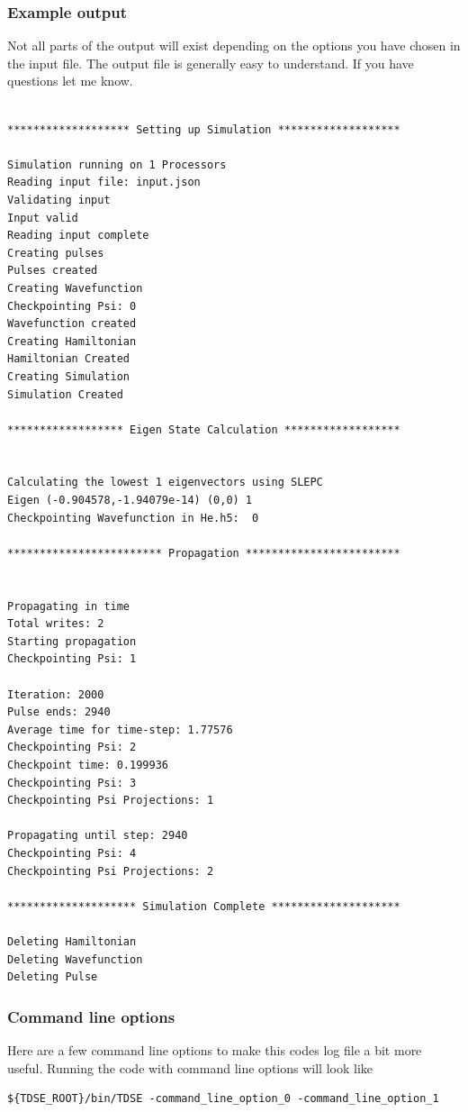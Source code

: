 \documentclass{article}
\begin{document}
\subsubsection{Example output}
\label{ssub:example_output}
Not all parts of the output will exist depending on the options you have chosen in the input file. The output file is generally easy to understand. If you have questions let me know.
\begin{verbatim}

******************* Setting up Simulation *******************

Simulation running on 1 Processors
Reading input file: input.json
Validating input
Input valid
Reading input complete
Creating pulses
Pulses created
Creating Wavefunction
Checkpointing Psi: 0
Wavefunction created
Creating Hamiltonian
Hamiltonian Created
Creating Simulation
Simulation Created

****************** Eigen State Calculation ******************


Calculating the lowest 1 eigenvectors using SLEPC
Eigen (-0.904578,-1.94079e-14) (0,0) 1
Checkpointing Wavefunction in He.h5:  0

************************ Propagation ************************


Propagating in time
Total writes: 2
Starting propagation
Checkpointing Psi: 1

Iteration: 2000
Pulse ends: 2940
Average time for time-step: 1.77576
Checkpointing Psi: 2
Checkpoint time: 0.199936
Checkpointing Psi: 3
Checkpointing Psi Projections: 1

Propagating until step: 2940
Checkpointing Psi: 4
Checkpointing Psi Projections: 2

******************** Simulation Complete ********************

Deleting Hamiltonian
Deleting Wavefunction
Deleting Pulse
\end{verbatim}
\newpage

\subsubsection{Command line options} %
\label{ssub:command_line_options}
Here are a few command line options to make this codes log file a bit more useful. Running the code with command line options will look like
\begin{verbatim}
${TDSE_ROOT}/bin/TDSE -command_line_option_0 -command_line_option_1
\end{verbatim}
\end{document}
